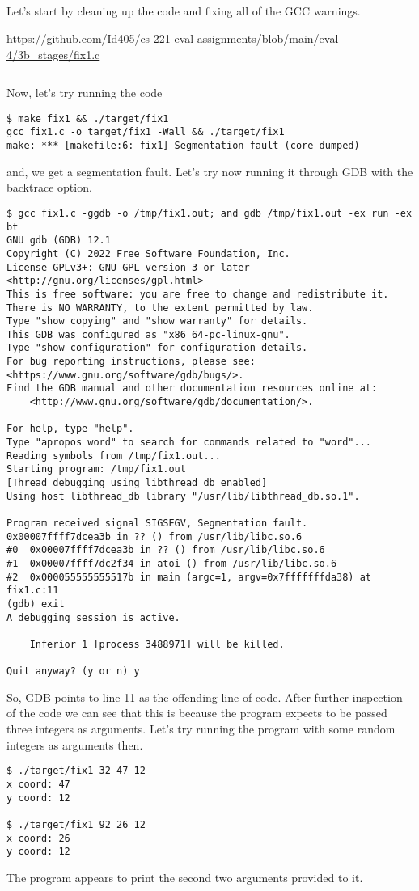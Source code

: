 \documentclass{article}
\newcommand{\nicecode}[2]{\inputminted[linenos=true,breaklines,fontsize=\small]{#1}{#2}}
\begin{document}
\newpage
\subsection{}
Let's start by cleaning up the code and fixing all of the GCC warnings.
\vspace{2ex} \par
\url{https://github.com/Id405/cs-221-eval-assignments/blob/main/eval-4/3b_stages/fix1.c}
\nicecode{c}{3b_stages/fix1.c}
Now, let's try running the code
\begin{verbatim}
$ make fix1 && ./target/fix1
gcc fix1.c -o target/fix1 -Wall && ./target/fix1
make: *** [makefile:6: fix1] Segmentation fault (core dumped)
\end{verbatim}
and, we get a segmentation fault. Let's try now running it through GDB with the backtrace option.
\begin{verbatim}
$ gcc fix1.c -ggdb -o /tmp/fix1.out; and gdb /tmp/fix1.out -ex run -ex bt
GNU gdb (GDB) 12.1
Copyright (C) 2022 Free Software Foundation, Inc.
License GPLv3+: GNU GPL version 3 or later <http://gnu.org/licenses/gpl.html>
This is free software: you are free to change and redistribute it.
There is NO WARRANTY, to the extent permitted by law.
Type "show copying" and "show warranty" for details.
This GDB was configured as "x86_64-pc-linux-gnu".
Type "show configuration" for configuration details.
For bug reporting instructions, please see:
<https://www.gnu.org/software/gdb/bugs/>.
Find the GDB manual and other documentation resources online at:
	<http://www.gnu.org/software/gdb/documentation/>.

For help, type "help".
Type "apropos word" to search for commands related to "word"...
Reading symbols from /tmp/fix1.out...
Starting program: /tmp/fix1.out
[Thread debugging using libthread_db enabled]
Using host libthread_db library "/usr/lib/libthread_db.so.1".

Program received signal SIGSEGV, Segmentation fault.
0x00007ffff7dcea3b in ?? () from /usr/lib/libc.so.6
#0  0x00007ffff7dcea3b in ?? () from /usr/lib/libc.so.6
#1  0x00007ffff7dc2f34 in atoi () from /usr/lib/libc.so.6
#2  0x000055555555517b in main (argc=1, argv=0x7fffffffda38) at fix1.c:11
(gdb) exit
A debugging session is active.

	Inferior 1 [process 3488971] will be killed.

Quit anyway? (y or n) y
\end{verbatim}
So, GDB points to line 11 as the offending line of code. After further inspection of the code we can see that this is because the program expects to be passed three integers as arguments. Let's try running the program with some random integers as arguments then.
\begin{verbatim}
$ ./target/fix1 32 47 12
x coord: 47
y coord: 12

$ ./target/fix1 92 26 12
x coord: 26
y coord: 12
\end{verbatim}
The program appears to print the second two arguments provided to it.
\end{document}
